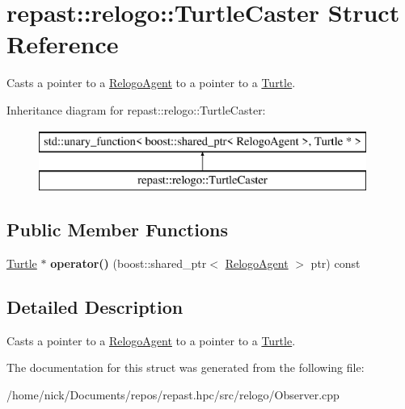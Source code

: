 \hypertarget{structrepast_1_1relogo_1_1_turtle_caster}{\section{repast\-:\-:relogo\-:\-:Turtle\-Caster Struct Reference}
\label{structrepast_1_1relogo_1_1_turtle_caster}
}


Casts a pointer to a \hyperlink{classrepast_1_1relogo_1_1_relogo_agent}{Relogo\-Agent} to a pointer to a \hyperlink{classrepast_1_1relogo_1_1_turtle}{Turtle}.  


Inheritance diagram for repast\-:\-:relogo\-:\-:Turtle\-Caster\-:\begin{figure}[H]
\begin{center}
\leavevmode
\includegraphics[height=2.000000cm]{structrepast_1_1relogo_1_1_turtle_caster}
\end{center}
\end{figure}
\subsection*{Public Member Functions}
\begin{DoxyCompactItemize}
\item 
\hypertarget{structrepast_1_1relogo_1_1_turtle_caster_add4a29ddb40cbe28574689d9f5212a1e}{\hyperlink{classrepast_1_1relogo_1_1_turtle}{Turtle} $\ast$ {\bfseries operator()} (boost\-::shared\-\_\-ptr$<$ \hyperlink{classrepast_1_1relogo_1_1_relogo_agent}{Relogo\-Agent} $>$ ptr) const }\label{structrepast_1_1relogo_1_1_turtle_caster_add4a29ddb40cbe28574689d9f5212a1e}

\end{DoxyCompactItemize}


\subsection{Detailed Description}
Casts a pointer to a \hyperlink{classrepast_1_1relogo_1_1_relogo_agent}{Relogo\-Agent} to a pointer to a \hyperlink{classrepast_1_1relogo_1_1_turtle}{Turtle}. 

The documentation for this struct was generated from the following file\-:\begin{DoxyCompactItemize}
\item 
/home/nick/\-Documents/repos/repast.\-hpc/src/relogo/Observer.\-cpp\end{DoxyCompactItemize}
